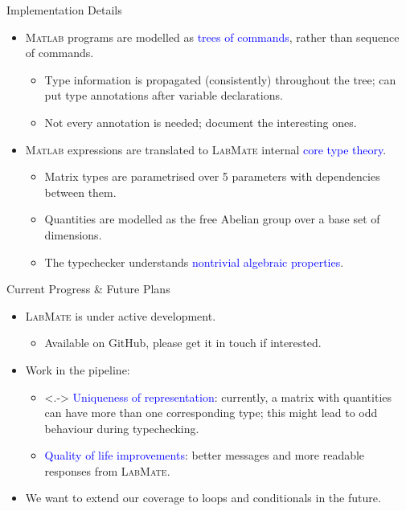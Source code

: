 \documentclass[]{beamer}
\newcommand{\keyword}[1]{\textcolor{blue}{#1}}
\newcommand{\lm}{\textsc{LabMate}\xspace}
\newcommand{\ma}{\textsc{Matlab}\xspace}
\begin{document}
\begin{frame}{Implementation Details}
  \begin{itemize}[<+->]
  \item \ma programs are modelled as \keyword{trees of commands}, rather than sequence of commands.
    \medskip
    \begin{itemize}
    \item Type information is propagated (consistently) throughout the tree; can put type annotations after variable declarations.
      \medskip
    \item Not every annotation is needed; document the interesting ones.
    \end{itemize}
    \medskip
  \item \ma expressions are translated to \lm internal \keyword{core type theory}.
    \medskip
    \begin{itemize}
    \item Matrix types are parametrised over 5 parameters with dependencies between them.
      \medskip
    \item Quantities are modelled as the free Abelian group over a base set of dimensions.
      \medskip
    \item The typechecker understands \keyword{nontrivial algebraic properties}.
    \end{itemize}
  \end{itemize}
\end{frame}

\begin{frame}{Current Progress \& Future Plans}
  \begin{itemize}[<+->]
  \item \lm is under active development.
    \smallskip
    \begin{itemize}[<.->]
    \item Available on GitHub, please get it in touch if interested.
    \end{itemize}
    \bigskip
  \item Work in the pipeline:
    \smallskip
    \begin{itemize}
    \item<.-> \keyword{Uniqueness of representation}: currently, a matrix with quantities can have more than one corresponding type; this might lead to odd behaviour during typechecking.
      \medskip
    \item \keyword{Quality of life improvements}: better messages and more readable responses from \lm.
      \medskip
      \end{itemize}
  \item We want to extend our coverage to loops and conditionals in the future.
  \end{itemize}
\end{frame}
\end{document}

